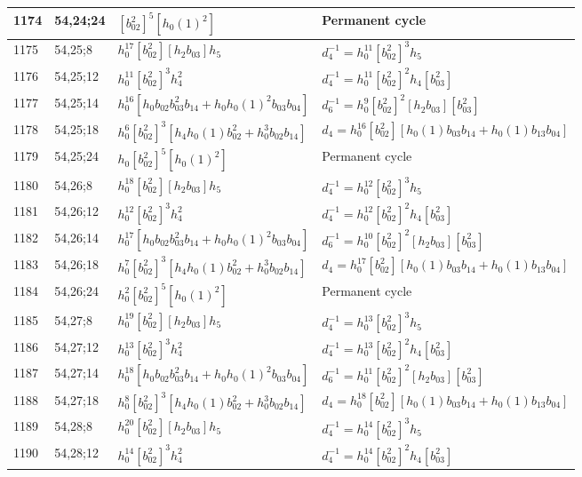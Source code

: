 \documentclass{article}
\begin{document}
\begin{longtable}{|l|l|>{\raggedright\arraybackslash}p{6cm}|>{\raggedright\arraybackslash}p{6cm}|}
\hline
1174 & 54,24;24 & $[b_{02}^2]^5[h_0(1)^2]$ & Permanent cycle\\
\hline
1175 & 54,25;8 & $h_0^{17}[b_{02}^2][h_2b_{03}]h_5$ & $d_{4}^{-1}=h_0^{11}[b_{02}^2]^3h_5$\\
\hline
1176 & 54,25;12 & $h_0^{11}[b_{02}^2]^3h_4^2$ & $d_{4}^{-1}=h_0^{11}[b_{02}^2]^2h_4[b_{03}^2]$\\
\hline
1177 & 54,25;14 & $h_0^{16}[h_0b_{02}b_{03}^2b_{14} + h_0h_0(1)^2b_{03}b_{04}]$ & $d_{6}^{-1}=h_0^9[b_{02}^2]^2[h_2b_{03}][b_{03}^2]$\\
\hline
1178 & 54,25;18 & $h_0^6[b_{02}^2]^3[h_4h_0(1)b_{02}^2 + h_0^3b_{02}b_{14}]$ &$d_{4}=h_0^{16}[b_{02}^2][h_0(1)b_{03}b_{14} + h_0(1)b_{13}b_{04}]$\\
\hline
1179 & 54,25;24 & $h_0[b_{02}^2]^5[h_0(1)^2]$ & Permanent cycle\\
\hline
1180 & 54,26;8 & $h_0^{18}[b_{02}^2][h_2b_{03}]h_5$ & $d_{4}^{-1}=h_0^{12}[b_{02}^2]^3h_5$\\
\hline
1181 & 54,26;12 & $h_0^{12}[b_{02}^2]^3h_4^2$ & $d_{4}^{-1}=h_0^{12}[b_{02}^2]^2h_4[b_{03}^2]$\\
\hline
1182 & 54,26;14 & $h_0^{17}[h_0b_{02}b_{03}^2b_{14} + h_0h_0(1)^2b_{03}b_{04}]$ & $d_{6}^{-1}=h_0^{10}[b_{02}^2]^2[h_2b_{03}][b_{03}^2]$\\
\hline
1183 & 54,26;18 & $h_0^7[b_{02}^2]^3[h_4h_0(1)b_{02}^2 + h_0^3b_{02}b_{14}]$ &$d_{4}=h_0^{17}[b_{02}^2][h_0(1)b_{03}b_{14} + h_0(1)b_{13}b_{04}]$\\
\hline
1184 & 54,26;24 & $h_0^2[b_{02}^2]^5[h_0(1)^2]$ & Permanent cycle\\
\hline
1185 & 54,27;8 & $h_0^{19}[b_{02}^2][h_2b_{03}]h_5$ & $d_{4}^{-1}=h_0^{13}[b_{02}^2]^3h_5$\\
\hline
1186 & 54,27;12 & $h_0^{13}[b_{02}^2]^3h_4^2$ & $d_{4}^{-1}=h_0^{13}[b_{02}^2]^2h_4[b_{03}^2]$\\
\hline
1187 & 54,27;14 & $h_0^{18}[h_0b_{02}b_{03}^2b_{14} + h_0h_0(1)^2b_{03}b_{04}]$ & $d_{6}^{-1}=h_0^{11}[b_{02}^2]^2[h_2b_{03}][b_{03}^2]$\\
\hline
1188 & 54,27;18 & $h_0^8[b_{02}^2]^3[h_4h_0(1)b_{02}^2 + h_0^3b_{02}b_{14}]$ &$d_{4}=h_0^{18}[b_{02}^2][h_0(1)b_{03}b_{14} + h_0(1)b_{13}b_{04}]$\\
\hline
1189 & 54,28;8 & $h_0^{20}[b_{02}^2][h_2b_{03}]h_5$ & $d_{4}^{-1}=h_0^{14}[b_{02}^2]^3h_5$\\
\hline
1190 & 54,28;12 & $h_0^{14}[b_{02}^2]^3h_4^2$ & $d_{4}^{-1}=h_0^{14}[b_{02}^2]^2h_4[b_{03}^2]$\\

\end{longtable}
\end{document}
